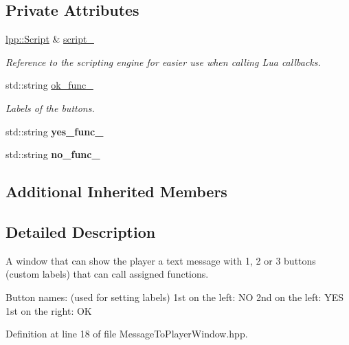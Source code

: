 \subsection*{Private Attributes}
\begin{DoxyCompactItemize}
\item 
\hyperlink{classlpp_1_1_script}{lpp\+::\+Script} \& \hyperlink{class_message_to_player_window_af02854c06fe25800f3dc44e23848a9df}{script\+\_\+}
\begin{DoxyCompactList}\small\item\em Reference to the scripting engine for easier use when calling Lua callbacks. \end{DoxyCompactList}\item 
std\+::string \hyperlink{class_message_to_player_window_a9ee321677a2a774e2e147ddbaef35ef5}{ok\+\_\+func\+\_\+}
\begin{DoxyCompactList}\small\item\em Labels of the buttons. \end{DoxyCompactList}\item 
std\+::string {\bfseries yes\+\_\+func\+\_\+}\hypertarget{class_message_to_player_window_a97cc7136d9ea8fd6e8397871555a6e0b}{}\label{class_message_to_player_window_a97cc7136d9ea8fd6e8397871555a6e0b}

\item 
std\+::string {\bfseries no\+\_\+func\+\_\+}\hypertarget{class_message_to_player_window_ae17d66e7dd9ae682ce23f89e79906e6b}{}\label{class_message_to_player_window_ae17d66e7dd9ae682ce23f89e79906e6b}

\end{DoxyCompactItemize}
\subsection*{Additional Inherited Members}


\subsection{Detailed Description}
A window that can show the player a text message with 1, 2 or 3 buttons (custom labels) that can call assigned functions. 

Button names\+: (used for setting labels) 1st on the left\+: NO 2nd on the left\+: Y\+ES 1st on the right\+: OK 

Definition at line 18 of file Message\+To\+Player\+Window.\+hpp.



